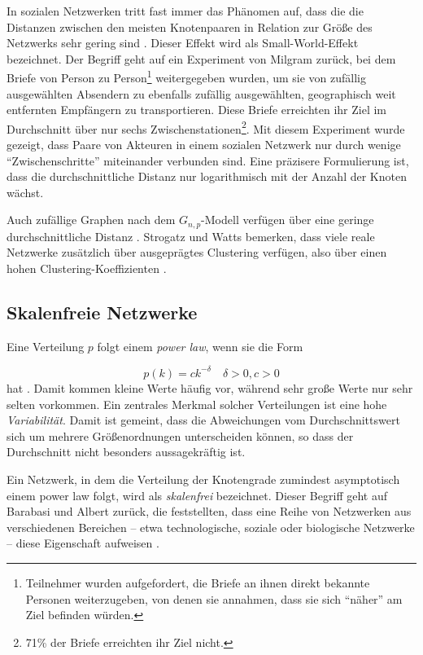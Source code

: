 In sozialen Netzwerken tritt fast immer das Ph\"anomen auf, dass die
die Distanzen zwischen den meisten Knotenpaaren in Relation zur
Gr\"o{\ss}e des Netzwerks sehr gering sind \cite{newman:167}. Dieser Effekt wird als
Small-World-Effekt bezeichnet. Der Begriff geht auf ein Experiment von 
Milgram zur\"uck, bei dem Briefe von Person zu
Person\footnote{Teilnehmer wurden aufgefordert, die Briefe an ihnen
  direkt bekannte Personen weiterzugeben, von denen sie annahmen, dass
  sie sich "`näher"' am Ziel befinden würden.} weitergegeben
wurden, um sie von zufällig ausgewählten Absendern zu ebenfalls
zufällig ausgewählten, geographisch weit entfernten Empfängern
zu transportieren\cite{Travers1969}. Diese Briefe erreichten ihr Ziel
im Durchschnitt über nur sechs Zwischenstationen\footnote{71\% der
  Briefe erreichten ihr Ziel nicht.}. Mit diesem Experiment wurde
gezeigt, dass Paare von Akteuren in einem sozialen Netzwerk nur durch
wenige "`Zwischenschritte"' miteinander verbunden
sind. Eine präzisere Formulierung
ist, dass die durchschnittliche Distanz nur logarithmisch mit der
Anzahl der Knoten wächst.

Auch zufällige Graphen nach dem $G_{n,p}$-Modell verfügen über eine geringe
durchschnittliche Distanz \cite{Baumann2004}. Strogatz und Watts bemerken, dass viele
reale Netzwerke zusätzlich über ausgeprägtes Clustering
verfügen, also über einen hohen
Clustering-Koeffizienten \cite{Watts1998}.

\subsection{Skalenfreie Netzwerke}
\label{sec:skal-netzw}

Eine Verteilung $p$ folgt einem \emph{power law}, wenn sie die Form

\begin{equation}
  \label{eq:8}
  p(k) = ck^{-\delta} \quad \delta > 0, c > 0
\end{equation}
hat \cite{Baumann2004}. Damit kommen kleine Werte häufig vor,
während sehr große Werte nur sehr selten vorkommen.  Ein zentrales
Merkmal solcher Verteilungen ist eine hohe
\emph{Variabilität}. Damit ist gemeint, dass die Abweichungen vom
Durchschnittswert sich um mehrere Größenordnungen unterscheiden
können, so dass der Durchschnitt nicht besonders aussagekräftig
ist.

Ein Netzwerk, in dem die Verteilung der Knotengrade zumindest
asymptotisch einem power law
folgt, wird als \emph{skalenfrei} bezeichnet. Dieser Begriff geht auf
Barabasi und Albert zurück, die feststellten, dass eine Reihe von
Netzwerken aus verschiedenen Bereichen -- etwa technologische, soziale
oder biologische Netzwerke -- diese Eigenschaft
aufweisen \cite{Barabasi1999}.

